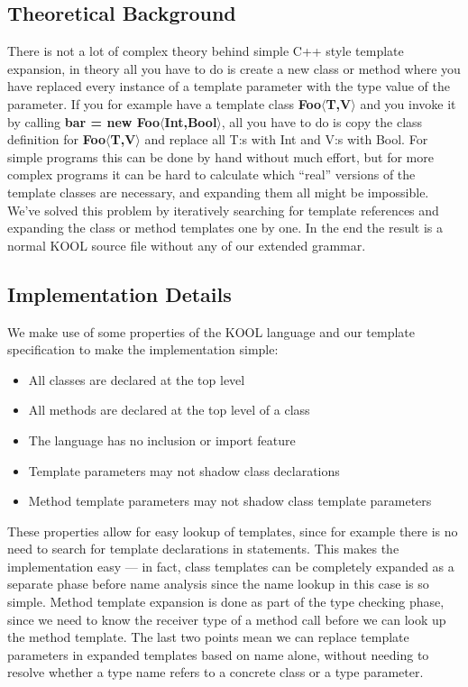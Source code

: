 \subsection{Theoretical Background}

There is not a lot of complex theory behind simple C++ style template expansion, in theory all you
have to do is create a new class or method where you have replaced every instance of a template
parameter with the type value of the parameter.  If you for example have a template class
\textbf{Foo$\langle$T,V$\rangle$} and you invoke it by calling \textbf{bar = new
Foo$\langle$Int,Bool$\rangle$}, all you have to do is copy the class definition for
\textbf{Foo$\langle$T,V$\rangle$} and replace all T:s with Int and V:s with Bool. For simple
programs this can be done by hand without much effort, but for more complex programs it can be hard
to calculate which ``real'' versions of the template classes are necessary, and expanding them all
might be impossible. We've solved this problem by iteratively searching for template references and
expanding the class or method templates one by one. In the end the result is a normal KOOL source
file without any of our extended grammar.

\subsection{Implementation Details}

We make use of some properties of the KOOL language and our template specification to make the
implementation simple:

\begin{itemize}
    \item All classes are declared at the top level
    \item All methods are declared at the top level of a class
    \item The language has no inclusion or import feature
    \item Template parameters may not shadow class declarations
    \item Method template parameters may not shadow class template parameters
\end{itemize}

These properties allow for easy lookup of templates, since for example there is no need to search
for template declarations in statements. This makes the implementation easy --- in fact, class
templates can be completely expanded as a separate phase before name analysis since the name lookup
in this case is so simple. Method template expansion is done as part of the type checking phase,
since we need to know the receiver type of a method call before we can look up the method template.
The last two points mean we can replace template parameters in expanded templates based on name
alone, without needing to resolve whether a type name refers to a concrete class or a type
parameter.

